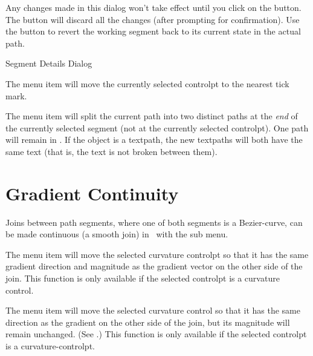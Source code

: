 Any changes made in this dialog won't take effect until you click on
the  button. The  button will discard all the
changes (after prompting for confirmation). Use the 
 button to revert the working segment
back to its current state in the actual path.

{}
{Segment Details Dialog}


The  menu item will
move the currently selected \gls*{controlpt} to the nearest
tick mark.


The  menu item will split the current path
into two distinct \glspl{path} at the \emph{end} of the currently
selected segment (not at the currently selected \gls*{controlpt}).
One path will remain in \editpathmode. 
If the object is a \gls*{textpath}, the new \glspl*{textpath} will
both have the same text (that is, the text is not broken between
them).


\section{Gradient Continuity}\label{sec:continous}

Joins between \gls{path} segments, where one of both segments is a
\gls{Bezier-curve}, can be made continuous (a smooth join)
in \editpathmode\ with the  sub menu.


The  menu item will move the selected
curvature \gls*{controlpt} so that it has the same gradient
direction and magnitude as the gradient vector on the other side of
the join.
This function is only available if the selected \gls{controlpt} is
a curvature control.


The  menu item will move the
selected curvature control so that it has the same direction as the
gradient on the other side of the join, but its magnitude will
remain unchanged. (See .)
This function is only available if the selected \gls{controlpt} is
a \gls{curvature-controlpt}.

